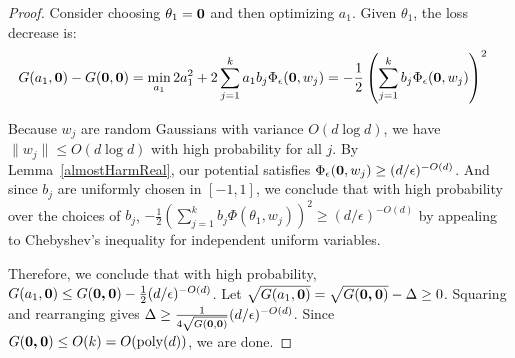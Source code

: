 \AlmostHarmInitialize*

 \begin{proof}
  Consider choosing $\theta_1 = {\bf 0}$ and then
  optimizing $a_1$. Given $\theta_1$, the loss decrease is:
%
\begin{align*}
   G(a_1,{\bf 0}) - G({\bf 0},{\bf 0}) & = \min_{a_1} 2a_1^2 +
  2\sum_{j=1}^k a_1 b_j\Phi_\epsilon({\bf 0},w_j) 
 = -\frac{1}{2}\left(  \sum_{j=1}^k b_j
   \Phi_\epsilon({\bf 0},w_j)\right)^2 
\end{align*}

Because $w_j$ are random Gaussians with variance $O(d \log d)$, we have $\|w_j\| \leq O(d\log d)$  with high probability for all $j$. By Lemma~\ref{almostHarmReal}, our potential satisfies ${\Phi}_\epsilon({\bf 0}, w_j) \geq (d/\epsilon)^{ - O(d)}$. And since $b_j$ are uniformly chosen in $[-1,1]$, we conclude that with high probability over the choices of $b_j$, $-\frac{1}{2}\left( \sum_{j=1}^k b_j\Phi(\theta_1,w_j)\right)^2 \geq (d/\epsilon)^{ - O(d)}$ by appealing to Chebyshev's inequality for independent uniform variables. 

Therefore, we conclude that with high probability, $G(a_1, {\bf 0}) \leq G(\boldsymbol{0,0}) - \frac{1}{2}(d/\epsilon)^{ - O(d)}$. Let $\sqrt{G(a_1, {\bf 0})} = \sqrt{G(\boldsymbol{0,0})} - \Delta \geq 0$. Squaring and rearranging gives $\Delta \geq \frac{1}{4\sqrt{G({\bf 0, 0})}}(d/\epsilon)^{ - O(d)}$. Since $G(\boldsymbol{0,0}) \leq O(k) = O(\mathrm{poly}(d))$, we are done. 
\end{proof}
%
%



